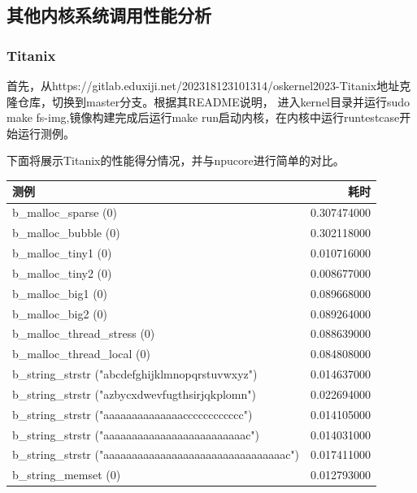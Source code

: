 \subsection{其他内核系统调用性能分析}


\subsubsection{Titanix}

首先，从https://gitlab.eduxiji.net/202318123101314/oskernel2023-Titanix地址克隆仓库，切换到master分支。根据其README说明，
进入kernel目录并运行sudo make fs-img,镜像构建完成后运行make run启动内核，在内核中运行runtestcase开始运行测例。

下面将展示Titanix的性能得分情况，并与npucore进行简单的对比。

\begin{table}[H]
    \centering
    \begin{tabular}{|l|r|}
        \hline
        测例 & 耗时 \\
        \hline
        b\_malloc\_sparse (0) & 0.307474000 \\
        \hline
        b\_malloc\_bubble (0) & 0.302118000 \\
        \hline
        b\_malloc\_tiny1 (0) & 0.010716000 \\
        \hline
        b\_malloc\_tiny2 (0) & 0.008677000 \\
        \hline
        b\_malloc\_big1 (0) & 0.089668000 \\
        \hline
        b\_malloc\_big2 (0) & 0.089264000 \\
        \hline
        b\_malloc\_thread\_stress (0) & 0.088639000 \\
        \hline
        b\_malloc\_thread\_local (0) & 0.084808000 \\
        \hline
        b\_string\_strstr ("abcdefghijklmnopqrstuvwxyz") & 0.014637000 \\
        \hline
        b\_string\_strstr ("azbycxdwevfugthsirjqkplomn") & 0.022694000 \\
        \hline
        b\_string\_strstr ("aaaaaaaaaaaaaacccccccccccc") & 0.014105000 \\
        \hline
        b\_string\_strstr ("aaaaaaaaaaaaaaaaaaaaaaaaac") & 0.014031000 \\
        \hline
        b\_string\_strstr ("aaaaaaaaaaaaaaaaaaaaaaaaaaaaaaaac") & 0.017411000 \\
        \hline
        b\_string\_memset (0) & 0.012793000 \\

\end{tabular}
\end{table}
